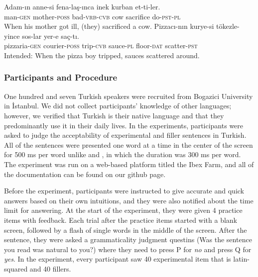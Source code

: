 \documentclass[doc]{apa6}
\begin{document}
\begin{exe}
\ex
\begin{xlist}
\ex \label{fillera}
\gll Adam-{\i}n anne-si fena-la\c{s}-{\i}nca inek kurban et-ti-ler.\\
man-\textsc{gen} mother-\textsc{poss} bad-\textsc{vrb}-\textsc{cvb} cow sacrifice do-\textsc{pst}-\textsc{pl}\\
\glt When his mother got ill, (they) sacrificed a cow.
\ex \label{fillerb}
\gll *Pizzac{\i}-n{\i}n kurye-si t\"{o}kezle-yince sos-lar yer-e sa\c{c}-t{\i}.\\
pizzaria-\textsc{gen} courier-\textsc{poss} trip-\textsc{cvb} sauce-\textsc{pl} floor-\textsc{dat} scatter-\textsc{pst}\\
\glt Intended: When the pizza boy tripped, sauces scattered around. 
\end{xlist}
\end{exe}

\hypertarget{participants-and-procedure}{%
\subsubsection{Participants and Procedure}\label{participants-and-procedure}}

One hundred and seven Turkish speakers were recruited from Bogazici University in İstanbul. We did not collect participants' knowledge of other languages; however, we verified that Turkish is their native language and that they predominantly use it in their daily lives. In the experiments, participants were asked to judge the acceptability of experimental and filler sentences in Turkish. All of the sentences were presented one word at a time in the center of the screen for 500 ms per word unlike \textcite{Lago2018} and \textcite{Wagers2009}, in which the duration was 300 ms per word. The experiment was run on a web-based platform titled the Ibex Farm, and all of the documentation can be found on our github page.

Before the experiment, participants were instructed to give accurate and quick answers based on their own intuitions, and they were also notified about the time limit for answering. At the start of the experiment, they were given 4 practice items with feedback. Each trial after the practice items started with a blank screen, followed by a flash of single words in the middle of the screen. After the sentence, they were asked a grammaticality judgment questins (Was the sentence you read was natural to you?) where they need to press P for \emph{no} and press Q for \emph{yes}. In the experiment, every participant saw 40 experimental item that is latin-squared and 40 fillers.
\end{document}
